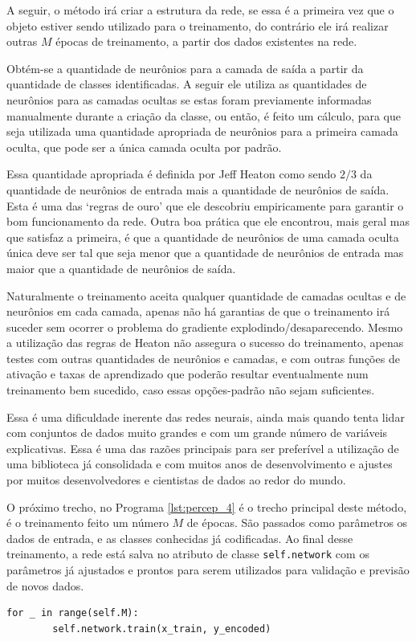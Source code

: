 A seguir, o método irá criar a estrutura da rede, se essa é a primeira vez que o objeto estiver sendo utilizado para o treinamento, do contrário ele irá realizar outras $M$ épocas de treinamento, a partir dos dados existentes na rede. 

Obtém-se a quantidade de neurônios para a camada de saída a partir da quantidade de classes identificadas. A seguir ele utiliza as quantidades de neurônios para as camadas ocultas se estas foram previamente informadas manualmente durante a criação da classe, ou então, é feito um cálculo, para que seja utilizada uma quantidade apropriada de neurônios para a primeira camada oculta, que pode ser a única camada oculta por padrão.

Essa quantidade apropriada é definida por Jeff Heaton \citep{layers_2} como sendo $2/3$ da quantidade de neurônios de entrada mais a quantidade de neurônios de saída. Esta é uma das `regras de ouro' que ele descobriu empiricamente para garantir o bom funcionamento da rede. Outra boa prática que ele encontrou, mais geral mas que satisfaz a primeira, é que a quantidade de neurônios de uma camada oculta única deve ser tal que seja menor que a quantidade de neurônios de entrada mas maior que a quantidade de neurônios de saída.

Naturalmente o treinamento aceita qualquer quantidade de camadas ocultas e de neurônios em cada camada, apenas não há garantias de que o treinamento irá suceder sem ocorrer o problema do gradiente explodindo/desaparecendo. Mesmo a utilização das regras de Heaton \citep{layers_2} não assegura o sucesso do treinamento, apenas testes com outras quantidades de neurônios e camadas, e com outras funções de ativação e taxas de aprendizado que poderão resultar eventualmente num treinamento bem sucedido, caso essas opções-padrão não sejam suficientes.

Essa é uma dificuldade inerente das redes neurais, ainda mais quando tenta lidar com conjuntos de dados muito grandes e com um grande número de variáveis explicativas. Essa é uma das razões principais para ser preferível a utilização de uma biblioteca já consolidada e com muitos anos de desenvolvimento e ajustes por muitos desenvolvedores e cientistas de dados ao redor do mundo.

O próximo trecho, no Programa \ref{lst:percep_4} é o trecho principal deste método, é o treinamento  feito um número $M$ de épocas. São passados como parâmetros os dados de entrada, e as classes conhecidas já codificadas. Ao final desse treinamento, a rede está salva no atributo de classe \texttt{self.network} com os parâmetros já ajustados e prontos para serem utilizados para validação e previsão de novos dados.
\newline
\estiloR
\begin{lstlisting}[caption={Trecho da classe \eng{Perceptron}}, label={lst:percep_4}, escapeinside={\%}]
    for _ in range(self.M):
        self.network.train(x_train, y_encoded)
\end{lstlisting}

